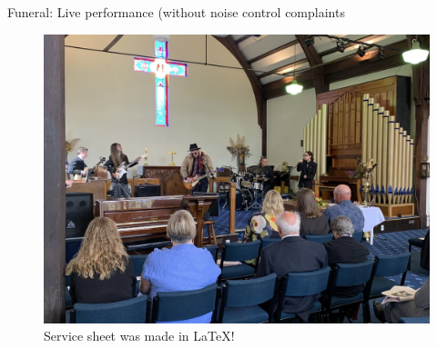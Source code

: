 \documentclass{beamer}
\begin{document}
\begin{frame}{Funeral: Live performance (without noise control complaints}

\begin{figure}
    \centering
    \includegraphics[width=\linewidth]{assets/wont_get_fooled_again.jpg}
    \caption{Service sheet was made in \LaTeX!}
    \label{fig:qr-code}
\end{figure}
\end{frame}




\end{document}
